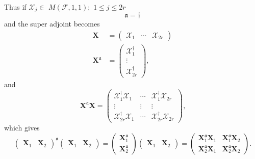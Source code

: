 \documentclass[aps, preprint]{revtex4}
\begin{document}
Thus if $\mathcal{X}_{j} \in $ $M \left (\mathcal{F} ,1 ,1\right ) ;$ $1 \leq j \leq 2 r$
\begin{equation}\mathfrak{a} = \dag 
\end{equation}and the super adjoint becomes
\begin{align}\mathbf{X} &  =\left (\begin{array}{ccc}\mathcal{X}_{1} & \cdots  & \mathcal{X}_{2 r}\end{array}\right ) \\
\mathbf{X}^{\mathfrak{a}} &  =\left (\begin{array}{c}\mathcal{X}_{1}^{ \dag } \\
\vdots  \\
\mathcal{X}_{2 r}^{ \dag }\end{array}\right )\text{,}\end{align}and
\begin{equation}\mathbf{X}^{\mathfrak{a}} \mathbf{X} =\left (\begin{array}{ccc}\mathcal{X}_{1}^{ \dag } \mathcal{X}_{1} & \cdots  & \mathcal{X}_{1}^{ \dag } \mathcal{X}_{2 r} \\
\vdots  & \vdots  & \vdots  \\
\mathcal{X}_{2 r}^{ \dag } \mathcal{X}_{1} & \cdots  & \mathcal{X}_{2 r}^{ \dag } \mathcal{X}_{2 r}\end{array}\right )\text{,}
\end{equation}which gives
\begin{equation}\left (\begin{array}{cc}\mathbf{X}_{1} & \mathbf{X}_{2}\end{array}\right )^{\mathfrak{a}} \left (\begin{array}{cc}\mathbf{X}_{1} & \mathbf{X}_{2}\end{array}\right ) =\left (\begin{array}{c}\mathbf{X}_{1}^{\mathfrak{a}} \\
\mathbf{X}_{2}^{\mathfrak{a}}\end{array}\right ) \left (\begin{array}{cc}\mathbf{X}_{1} & \mathbf{X}_{2}\end{array}\right ) =\left (\begin{array}{cc}\mathbf{X}_{1}^{\mathfrak{a}} \mathbf{X}_{1} & \mathbf{X}_{1}^{\mathfrak{a}} \mathbf{X}_{2} \\
\mathbf{X}_{2}^{\mathfrak{a}} \mathbf{X}_{1} & \mathbf{X}_{2}^{\mathfrak{a}} \mathbf{X}_{2}\end{array}\right )\text{.}
\end{equation}
\end{document}
